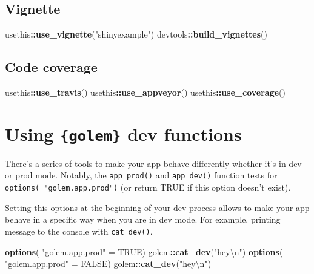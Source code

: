 \documentclass[]{book}
\newenvironment{Shaded}{\begin{snugshade}}{\end{snugshade}}
\newcommand{\CharTok}[1]{\textcolor[rgb]{0.31,0.60,0.02}{#1}}
\newcommand{\KeywordTok}[1]{\textcolor[rgb]{0.13,0.29,0.53}{\textbf{#1}}}
\newcommand{\NormalTok}[1]{#1}
\newcommand{\OperatorTok}[1]{\textcolor[rgb]{0.81,0.36,0.00}{\textbf{#1}}}
\newcommand{\OtherTok}[1]{\textcolor[rgb]{0.56,0.35,0.01}{#1}}
\newcommand{\StringTok}[1]{\textcolor[rgb]{0.31,0.60,0.02}{#1}}
\begin{document}
\hypertarget{vignette}{%
\subsection{Vignette}\label{vignette}}

\begin{Shaded}
\begin{Highlighting}[]
\NormalTok{usethis}\OperatorTok{::}\KeywordTok{use_vignette}\NormalTok{(}\StringTok{"shinyexample"}\NormalTok{)}
\NormalTok{devtools}\OperatorTok{::}\KeywordTok{build_vignettes}\NormalTok{()}
\end{Highlighting}
\end{Shaded}

\hypertarget{code-coverage}{%
\subsection{Code coverage}\label{code-coverage}}

\begin{Shaded}
\begin{Highlighting}[]
\NormalTok{usethis}\OperatorTok{::}\KeywordTok{use_travis}\NormalTok{()}
\NormalTok{usethis}\OperatorTok{::}\KeywordTok{use_appveyor}\NormalTok{()}
\NormalTok{usethis}\OperatorTok{::}\KeywordTok{use_coverage}\NormalTok{()}
\end{Highlighting}
\end{Shaded}

\hypertarget{using-golem-dev-functions}{%
\section{\texorpdfstring{Using \texttt{\{golem\}} dev functions}{Using \{golem\} dev functions}}\label{using-golem-dev-functions}}

There's a series of tools to make your app behave differently whether it's in dev or prod mode. Notably, the \texttt{app\_prod()} and \texttt{app\_dev()} function tests for \texttt{options(\ "golem.app.prod")} (or return TRUE if this option doesn't exist).

Setting this options at the beginning of your dev process allows to make your app behave in a specific way when you are in dev mode. For example, printing message to the console with \texttt{cat\_dev()}.

\begin{Shaded}
\begin{Highlighting}[]
\KeywordTok{options}\NormalTok{( }\StringTok{"golem.app.prod"}\NormalTok{ =}\StringTok{ }\OtherTok{TRUE}\NormalTok{)}
\NormalTok{golem}\OperatorTok{::}\KeywordTok{cat_dev}\NormalTok{(}\StringTok{"hey}\CharTok{\textbackslash{}n}\StringTok{"}\NormalTok{)}
\KeywordTok{options}\NormalTok{( }\StringTok{"golem.app.prod"}\NormalTok{ =}\StringTok{ }\OtherTok{FALSE}\NormalTok{)}
\NormalTok{golem}\OperatorTok{::}\KeywordTok{cat_dev}\NormalTok{(}\StringTok{"hey}\CharTok{\textbackslash{}n}\StringTok{"}\NormalTok{)}
\end{Highlighting}
\end{Shaded}
\end{document}
